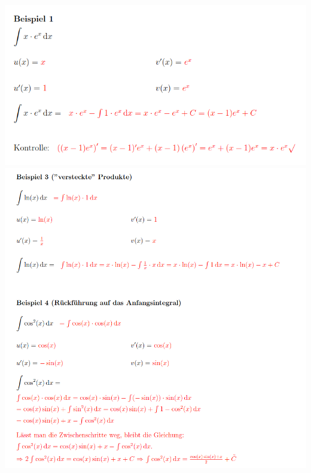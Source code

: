\begin{center}
  \includegraphics[width=0.9\linewidth]{images/partiell1.png}
  \includegraphics[width=0.9\linewidth]{images/partiell2.png}
\end{center}

